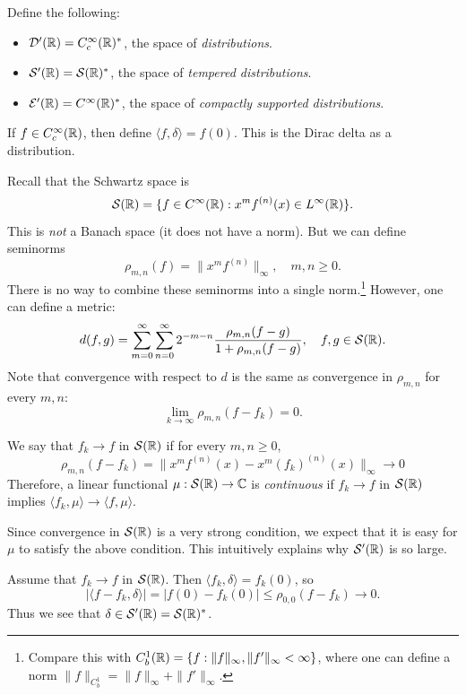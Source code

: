 \begin{definition}
  Define the following:
  \begin{itemize}
    \item $\mathcal{D}'(\mathbb{R}) = C_c^\infty(\mathbb{R})^*$,
      the space of
      \emph{distributions}.
    \item $\mathcal{S}'(\mathbb{R}) = \mathcal{S}(\mathbb{R})^*$,
      the space of
      \emph{tempered distributions}.
    \item $\mathcal{E}'(\mathbb{R}) = C^\infty(\mathbb{R})^*$,
      the space of
      \emph{compactly supported distributions}.
  \end{itemize}
\end{definition}

\begin{example}
  If $f \in C_c^\infty(\mathbb{R})$,
  then define
  $\langle f, \delta \rangle = f(0)$.
  This is the Dirac delta as
  a distribution.
\end{example}

\begin{remark}
  Recall that the Schwartz space is
  \[
    \mathcal{S}(\mathbb{R})
    = \{f \in C^\infty(\mathbb{R}) : x^m f^{(n)}(x) \in L^\infty(\mathbb{R})\}.
  \]
  This is \emph{not} a Banach space
  (it does not have a norm).
  But we can define seminorms
  \[
    \rho_{m, n}(f)
    = \|x^m f^{(n)}\|_\infty, \quad
    m, n \ge 0.
  \]
  There is no way to combine these
  seminorms into a single norm.\footnote{Compare this with $C^1_b(\mathbb{R}) = \{f : \|f\|_\infty, \|f'\|_\infty < \infty\}$, where one can define a norm $\|f\|_{C^1_b} = \|f\|_\infty + \|f'\|_\infty$.}
  However, one can define a metric:
  \[
    d(f, g)
    = \sum_{m = 0}^\infty \sum_{n = 0}^\infty
    2^{-m - n}
    \frac{\rho_{m, n}(f - g)}{1 + \rho_{m, n}(f - g)}, \quad f, g \in \mathcal{S}(\mathbb{R}).
  \]
  Note that convergence with respect
  to $d$ is the same as
  convergence in $\rho_{m, n}$ for
  every $m, n$:
  \[
    \lim_{k \to \infty}
    \rho_{m, n}(f - f_k) = 0.
  \]
\end{remark}

\begin{definition}
  We say that $f_k \to f$ in
  $\mathcal{S}(\mathbb{R})$ if for every
  $m, n \ge 0$,
  \[
    \rho_{m, n}(f - f_k) = \|x^m f^{(n)}(x) - x^m (f_k)^{(n)}(x)\|_\infty \longrightarrow 0
  \]
  Therefore, a linear functional
  $\mu : \mathcal{S}(\mathbb{R}) \to \mathbb{C}$
  is \emph{continuous} if
  $f_k \to f$ in $\mathcal{S}(\mathbb{R})$
  implies $\langle f_k, \mu \rangle \to \langle f, \mu \rangle$.
\end{definition}

\begin{remark}
  Since convergence in $\mathcal{S}(\mathbb{R})$
  is a very strong condition,
  we expect that it is easy for
  $\mu$ to satisfy the above
  condition. This intuitively explains
  why $\mathcal{S}'(\mathbb{R})$ is so large.
\end{remark}

\begin{example}
  Assume that
  $f_k \to f$ in $\mathcal{S}(\mathbb{R})$.
  Then $\langle f_k, \delta \rangle = f_k(0)$, so
  \[
    |\langle f - f_k, \delta \rangle|
    = |f(0) - f_k(0)|
    \le \rho_{0, 0}(f - f_k)
    \longrightarrow 0.
  \]
  Thus we see that $\delta \in \mathcal{S}'(\mathbb{R}) = \mathcal{S}(\mathbb{R})^*$.
\end{example}
